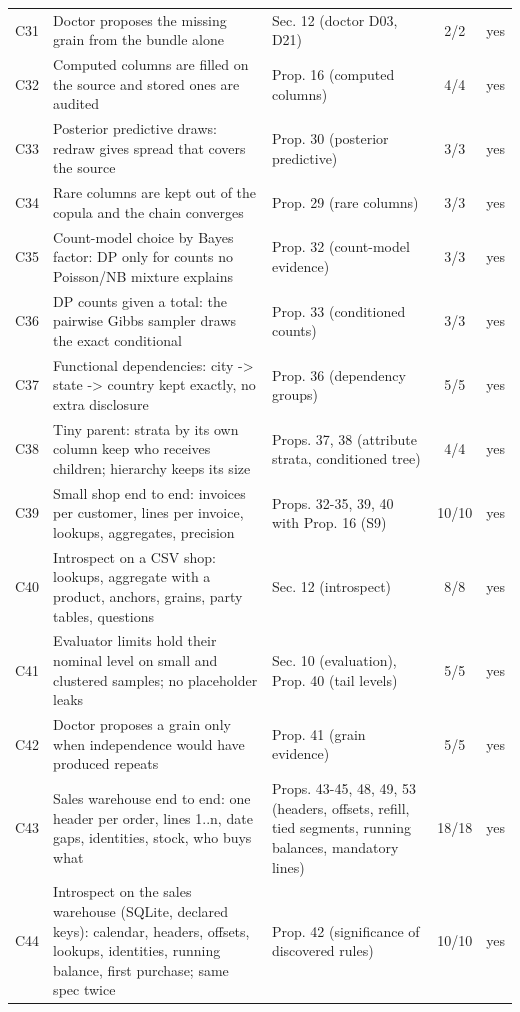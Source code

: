 \begin{longtable}{@{}l p{8.2cm} p{3.6cm} c r@{}}
C31 & Doctor proposes the missing grain from the bundle alone & Sec. 12 (doctor D03, D21) & 2/2 & yes \\
C32 & Computed columns are filled on the source and stored ones are audited & Prop. 16 (computed columns) & 4/4 & yes \\
C33 & Posterior predictive draws: redraw gives spread that covers the source & Prop. 30 (posterior predictive) & 3/3 & yes \\
C34 & Rare columns are kept out of the copula and the chain converges & Prop. 29 (rare columns) & 3/3 & yes \\
C35 & Count-model choice by Bayes factor: DP only for counts no Poisson/NB mixture explains & Prop. 32 (count-model evidence) & 3/3 & yes \\
C36 & DP counts given a total: the pairwise Gibbs sampler draws the exact conditional & Prop. 33 (conditioned counts) & 3/3 & yes \\
C37 & Functional dependencies: city -> state -> country kept exactly, no extra disclosure & Prop. 36 (dependency groups) & 5/5 & yes \\
C38 & Tiny parent: strata by its own column keep who receives children; hierarchy keeps its size & Props. 37, 38 (attribute strata, conditioned tree) & 4/4 & yes \\
C39 & Small shop end to end: invoices per customer, lines per invoice, lookups, aggregates, precision & Props. 32-35, 39, 40 with Prop. 16 (S9) & 10/10 & yes \\
C40 & Introspect on a CSV shop: lookups, aggregate with a product, anchors, grains, party tables, questions & Sec. 12 (introspect) & 8/8 & yes \\
C41 & Evaluator limits hold their nominal level on small and clustered samples; no placeholder leaks & Sec. 10 (evaluation), Prop. 40 (tail levels) & 5/5 & yes \\
C42 & Doctor proposes a grain only when independence would have produced repeats & Prop. 41 (grain evidence) & 5/5 & yes \\
C43 & Sales warehouse end to end: one header per order, lines 1..n, date gaps, identities, stock, who buys what & Props. 43-45, 48, 49, 53 (headers, offsets, refill, tied segments, running balances, mandatory lines) & 18/18 & yes \\
C44 & Introspect on the sales warehouse (SQLite, declared keys): calendar, headers, offsets, lookups, identities, running balance, first purchase; same spec twice & Prop. 42 (significance of discovered rules) & 10/10 & yes \\

\end{longtable}
